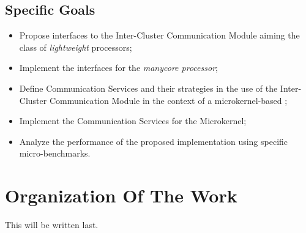 \subsection{Specific Goals}
\label{sec.goals.specific}

	\begin{itemize}
		\item Propose interfaces to the Inter-Cluster Communication Module aiming
			the class of \textit{lightweight} \manycore processors;
		\item Implement the interfaces for the \textit{\mppa manycore processor};
		\item Define Communication Services and their strategies in the use of the Inter-Cluster
			Communication Module in the context of a microkernel-based \os;
		\item Implement the Communication Services for the \nanvix Microkernel;
		\item Analyze the performance of the proposed implementation using specific micro-benchmarks.
	\end{itemize}

\section{Organization Of The Work}
\label{sec.organization}

	This will be written last.